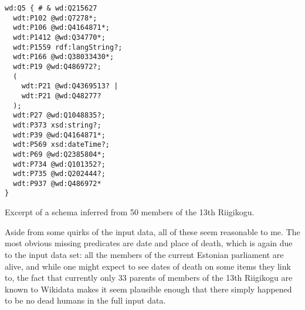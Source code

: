 \begin{lstfloat}[t]
\begin{lstlisting}[language=sparql]
wd:Q5 { # & wd:Q215627
  wdt:P102 @wd:Q7278*;
  wdt:P106 @wd:Q4164871*;
  wdt:P1412 @wd:Q34770*;
  wdt:P1559 rdf:langString?;
  wdt:P166 @wd:Q38033430*;
  wdt:P19 @wd:Q486972?;
  (
    wdt:P21 @wd:Q4369513? |
    wdt:P21 @wd:Q48277?
  );
  wdt:P27 @wd:Q1048835?;
  wdt:P373 xsd:string?;
  wdt:P39 @wd:Q4164871*;
  wdt:P569 xsd:dateTime?;
  wdt:P69 @wd:Q2385804*;
  wdt:P734 @wd:Q101352?;
  wdt:P735 @wd:Q202444?;
  wdt:P937 @wd:Q486972*
}
\end{lstlisting}
\caption{Excerpt of a schema inferred from 50 members of the 13th Riigikogu.}
\label{listing:13th-riigikogu-Q5}
\end{lstfloat}

Aside from some quirks of the input data, all of these seem reasonable to me.
The most obvious missing predicates are date and place of death,
which is again due to the input data set:
all the members of the current Estonian parliament are alive,
and while one might expect to see dates of death on some items they link to,
the fact that currently only 33 parents of members of the 13th Riigikogu are known to Wikidata
makes it seem plausible enough that there simply happened to be no dead humans in the full input data.

